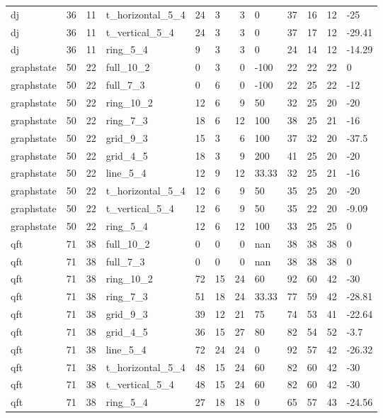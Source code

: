 \begin{longtable}{lrrlllrlllrl}
dj & 36 & 11 & t\_horizontal\_5\_4 & 24 & 3 & 3 & 0 & 37 & 16 & 12 & -25 \\
dj & 36 & 11 & t\_vertical\_5\_4 & 24 & 3 & 3 & 0 & 37 & 17 & 12 & -29.41 \\
dj & 36 & 11 & ring\_5\_4 & 9 & 3 & 3 & 0 & 24 & 14 & 12 & -14.29 \\
graphstate & 50 & 22 & full\_10\_2 & 0 & 3 & 0 & -100 & 22 & 22 & 22 & 0 \\
graphstate & 50 & 22 & full\_7\_3 & 0 & 6 & 0 & -100 & 22 & 25 & 22 & -12 \\
graphstate & 50 & 22 & ring\_10\_2 & 12 & 6 & 9 & 50 & 32 & 25 & 20 & -20 \\
graphstate & 50 & 22 & ring\_7\_3 & 18 & 6 & 12 & 100 & 38 & 25 & 21 & -16 \\
graphstate & 50 & 22 & grid\_9\_3 & 15 & 3 & 6 & 100 & 37 & 32 & 20 & -37.5 \\
graphstate & 50 & 22 & grid\_4\_5 & 18 & 3 & 9 & 200 & 41 & 25 & 20 & -20 \\
graphstate & 50 & 22 & line\_5\_4 & 12 & 9 & 12 & 33.33 & 32 & 25 & 21 & -16 \\
graphstate & 50 & 22 & t\_horizontal\_5\_4 & 12 & 6 & 9 & 50 & 35 & 25 & 20 & -20 \\
graphstate & 50 & 22 & t\_vertical\_5\_4 & 12 & 6 & 9 & 50 & 35 & 22 & 20 & -9.09 \\
graphstate & 50 & 22 & ring\_5\_4 & 12 & 6 & 12 & 100 & 33 & 25 & 25 & 0 \\
qft & 71 & 38 & full\_10\_2 & 0 & 0 & 0 & nan & 38 & 38 & 38 & 0 \\
qft & 71 & 38 & full\_7\_3 & 0 & 0 & 0 & nan & 38 & 38 & 38 & 0 \\
qft & 71 & 38 & ring\_10\_2 & 72 & 15 & 24 & 60 & 92 & 60 & 42 & -30 \\
qft & 71 & 38 & ring\_7\_3 & 51 & 18 & 24 & 33.33 & 77 & 59 & 42 & -28.81 \\
qft & 71 & 38 & grid\_9\_3 & 39 & 12 & 21 & 75 & 74 & 53 & 41 & -22.64 \\
qft & 71 & 38 & grid\_4\_5 & 36 & 15 & 27 & 80 & 82 & 54 & 52 & -3.7 \\
qft & 71 & 38 & line\_5\_4 & 72 & 24 & 24 & 0 & 92 & 57 & 42 & -26.32 \\
qft & 71 & 38 & t\_horizontal\_5\_4 & 48 & 15 & 24 & 60 & 82 & 60 & 42 & -30 \\
qft & 71 & 38 & t\_vertical\_5\_4 & 48 & 15 & 24 & 60 & 82 & 60 & 42 & -30 \\
qft & 71 & 38 & ring\_5\_4 & 27 & 18 & 18 & 0 & 65 & 57 & 43 & -24.56 \\

\end{longtable}
